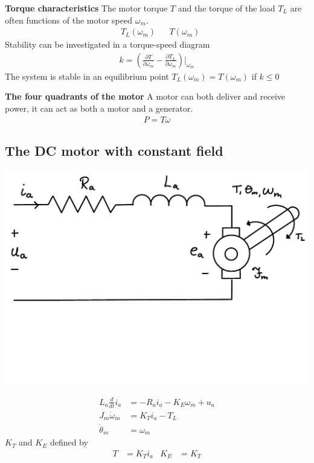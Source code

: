 \textbf{Torque characteristics}
The motor torque \(T\) and the torque of the load \(T_L\) are often functions of
the motor speed \(\omega_m\).
\begin{align*}
    &T_L(\omega_m) &  &T(\omega_m)
\end{align*}
Stability can be investigated in a torque-speed diagram
\begin{align*}
    k = \left(\frac{\partial T}{\partial \omega_m} - \frac{\partial T_L}{\partial \omega_m}\right)\Big|_{\omega_m}
\end{align*}
The system is stable in an equilibrium point \(T_L(\omega_m) = T(\omega_m)\) if \(k\leq 0\)
\newline

\textbf{The four quadrants of the motor}
A motor can both deliver and receive power, it can act as both a motor and a 
generator.
\begin{align*}
    P = T\omega
\end{align*}

\subsection{The DC motor with constant field} %
\begin{Figure}
    \includegraphics[clip, trim = 0cm 5cm 0cm 0cm,width=\linewidth]{figures/dc-motor.pdf}
    \label{fig:dc-motor}
\end{Figure}
\begin{align*}
    L_a\frac{d}{dt}i_a &= -R_a i_a - K_E \omega_m + u_a \\
    J_m \dot{\omega}_m &= K_T i_a - T_L \\
    \dot{\theta}_m &= \omega_m
\end{align*}
\(K_T\) and \(K_E\) defined by
\begin{align*}
    T&=K_T i_a  & K_E &=  K_T
\end{align*}


